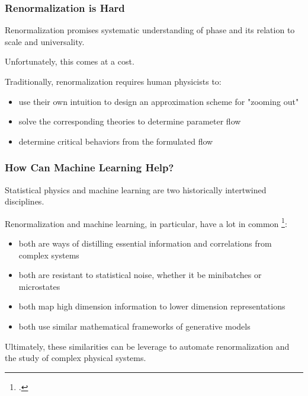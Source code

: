 \documentclass[aspectratio=169, 12pt]{beamer}
\begin{document}
\begin{frame}

    \frametitle{Renormalization is \textbf{Hard}}

    Renormalization promises systematic understanding of phase and its relation to scale and universality. 

    \vspace{1em}

    Unfortunately, this comes at a cost. 

    \vspace{1em}
    
    Traditionally, renormalization requires human physicists to:

    \begin{itemize}
        \item use their own intuition to design an approximation scheme for "zooming out"
        \item solve the corresponding theories to determine parameter flow
        \item determine critical behaviors from the formulated flow
    \end{itemize}

\end{frame}

\begin{frame}

    \frametitle{How Can Machine Learning Help?}

    Statistical physics and machine learning are two historically intertwined disciplines. 

    Renormalization and machine learning, in particular, have a lot in common \footcite{mlrg}:

    \begin{itemize}
        \item both are ways of distilling essential information and correlations from complex systems
        \item both are resistant to statistical noise, whether it be minibatches or microstates
        \item both map high dimension information to lower dimension representations
        \item both use similar mathematical frameworks of generative models
    \end{itemize}

    Ultimately, these similarities can be leverage to automate renormalization and the study of complex physical systems. 

\end{frame}
\end{document}
